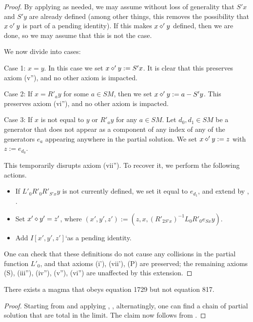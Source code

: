 \begin{proof}  By applying  as needed, we may assume without loss of generality that $S'x$ and $S'y$ are already defined (among other things, this removes the possibility that $x \diamond' y$ is part of a pending identity).  If this makes $x \diamond' y$ defined, then we are done, so we may assume that this is not the case.

We now divide into cases:

Case 1: $x=y$.  In this case we set $x \diamond' y := S'x$.  It is clear that this preserves axiom (v''), and no other axiom is impacted.

Case 2: If $x = R'_a y$ for some $a \in SM$, then we set $x \diamond' y := a - S'y$.  This preserves axiom (vi''), and no other axiom is impacted.

Case 3: If $x$ is not equal to $y$ or $R'_a y$ for any $a \in SM$.  Let $d_0, d_1 \in SM$ be a generator that does not appear as a component of any index of any of the generators $e_a$ appearing anywhere in the partial solution.  We set $x \diamond' y := z$ with $z := e_{d_0}$.

This temporarily disrupts axiom (vii'').  To recover it, we perform the following actions.
\begin{itemize}
  \item If $L'_0 R'_0 R'_{S'x} y$ is not currently defined, we set it equal to $e_{d_1}$, and extend by , .
  \item Set $x' \diamond y' = z'$, where $(x',y',z') := (z, x, (R'_{2S'x})^{-1} L_0 R'_0 e_{Sx} y)$.
  \item Add $I[x',y',z']$`as a pending identity.
\end{itemize}

One can check that these definitions do not cause any collisions in the partial function $L'_0$, and that axioms (i'), (vii'), (P) are preserved; the remaining axioms (S), (iii''), (iv''), (v''), (vi'') are unaffected by this extension.
\end{proof}


\begin{theorem}\label{1729_refute_817}\leanok There exists a magma that obeys equation 1729 but not equation 817.
\end{theorem}

\begin{proof}
  Starting from  and applying , ,  alternatingly, one can find a chain of partial solution that are total in the limit.  The claim now follows from .
\end{proof}
